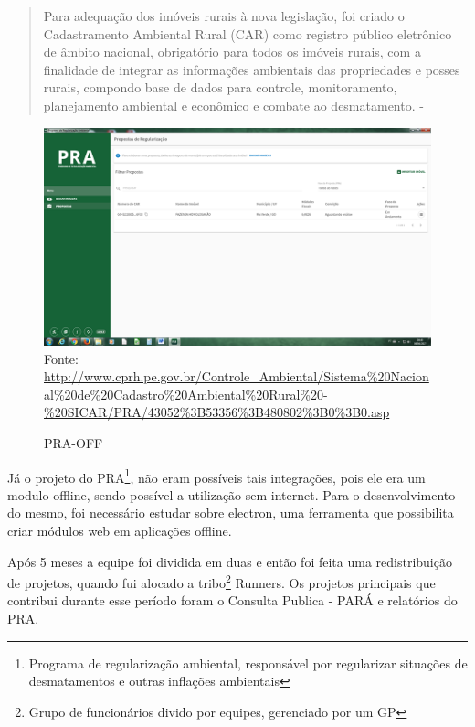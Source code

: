 \begin{quote}
    Para adequação dos imóveis rurais à nova legislação, foi criado o Cadastramento
Ambiental Rural (CAR) como registro público eletrônico de âmbito nacional,
obrigatório para todos os imóveis rurais, com a finalidade de integrar as informações ambientais das propriedades e posses rurais, compondo base de dados
para controle, monitoramento, planejamento ambiental e econômico e combate
ao desmatamento. - \cite{de2015cadastro}
\end{quote}
\begin{figure}[H]
\centering
\caption{PRA-OFF} %
\includegraphics[scale=0.5]{pra-off}\\  %
{\small Fonte: \url{http://www.cprh.pe.gov.br/Controle_Ambiental/Sistema%20Nacional%20de%20Cadastro%20Ambiental%20Rural%20-%20SICAR/PRA/43052%3B53356%3B480802%3B0%3B0.asp}} %
\label{fig:exemplo} %
\end{figure}

Já o projeto do PRA\footnote{Programa de regularização ambiental, responsável por regularizar situações de desmatamentos e outras inflações ambientais}, não eram possíveis tais integrações, pois ele era um modulo offline, sendo possível a utilização sem internet. Para o desenvolvimento do mesmo, foi necessário estudar sobre electron, uma ferramenta que possibilita criar módulos web em aplicações offline.

Após 5 meses a equipe foi dividida em duas e então foi feita uma redistribuição de projetos, quando fui alocado a tribo\footnote{Grupo de funcionários divido por equipes, gerenciado por um GP} Runners. Os projetos principais que contribui durante esse período foram o Consulta Publica - PARÁ e relatórios do PRA.

